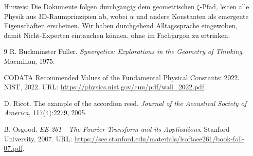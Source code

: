 	Hinweis: Die Dokumente folgen durchgängig dem geometrischen $\xi$-Pfad, leiten alle Physik aus 3D-Raumprinzipien ab, wobei $\alpha$ und andere Konstanten als emergente Eigenschaften erscheinen. Wir haben durchgehend Alltagssprache eingewoben, damit Nicht-Experten eintauchen können, ohne im Fachjargon zu ertrinken.

\begin{thebibliography}{9}
		R. Buckminster Fuller.
		\newblock \emph{Synergetics: Explorations in the Geometry of Thinking}.
		\newblock Macmillan, 1975.
		
		CODATA Recommended Values of the Fundamental Physical Constants: 2022.
		\newblock NIST, 2022.
		\newblock URL: \url{https://physics.nist.gov/cuu/pdf/wall_2022.pdf}.
		
		D. Ricot.
		\newblock The example of the accordion reed.
		\newblock \emph{Journal of the Acoustical Society of America}, 117(4):2279, 2005.
		
		B. Osgood.
		\newblock \emph{EE 261 - The Fourier Transform and its Applications}.
		\newblock Stanford University, 2007.
		\newblock URL: \url{https://see.stanford.edu/materials/lsoftaee261/book-fall-07.pdf}.
		
	\end{thebibliography}

